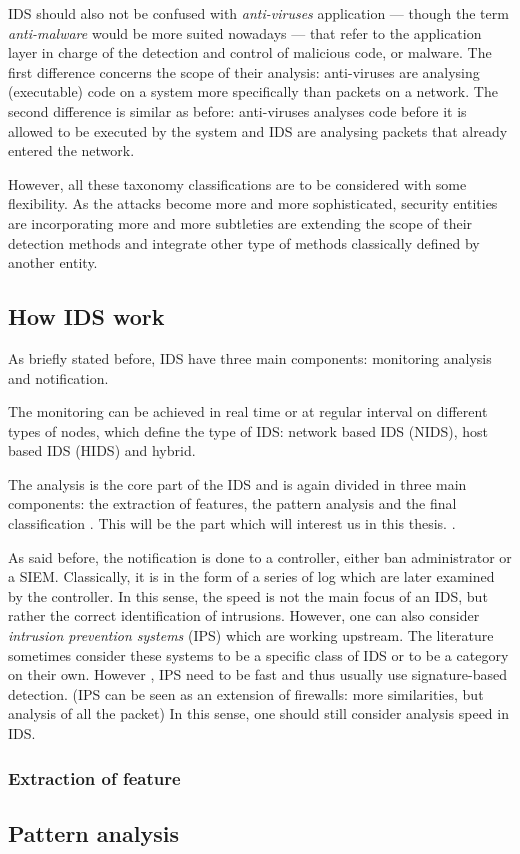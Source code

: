 IDS should also not be confused with \emph{anti-viruses} application --- though the term \emph{anti-malware} would be more suited nowadays --- that refer to the application layer in charge of the detection and control of malicious code, or malware. The first difference concerns the scope of their analysis: anti-viruses are analysing (executable) code on a system more specifically than packets on a network. The second difference is similar as before: anti-viruses analyses code before it is allowed to be executed by the system and IDS are analysing packets that already entered the network.

However, all these taxonomy classifications are to be considered with some flexibility. As the attacks become more and more sophisticated, security entities are incorporating more and more subtleties are extending the scope of their detection methods and integrate other type of methods classically defined by another entity. 

\subsection{How IDS work}
As briefly stated before, IDS have three main components: monitoring analysis and notification. 

The monitoring can be achieved in real time or at regular interval on different types of nodes, which define the type of IDS: network based IDS (NIDS), host based IDS (HIDS) and hybrid. 

The analysis is the core part of the IDS and is again divided in three main components: the extraction of features, the pattern analysis and the final classification \cite{Winter2018}. This will be the part which will interest us in this thesis. .

As said before, the notification is done to a controller, either ban administrator or a SIEM. Classically, it is in the form of a series of log which are later examined by the controller. In this sense, the speed is not the main focus of an IDS, but rather the correct identification of intrusions. However, one can also consider \emph{intrusion prevention systems} (IPS) which are working upstream. The literature sometimes consider these systems to be a specific class of IDS or to be a category on their own. However , IPS need to be fast and thus usually use signature-based detection. (IPS can be seen as an extension of firewalls: more similarities, but analysis of all the packet) In this sense, one should still consider analysis speed in IDS.

\subsubsection{Extraction of feature}


\subsection{Pattern analysis}
